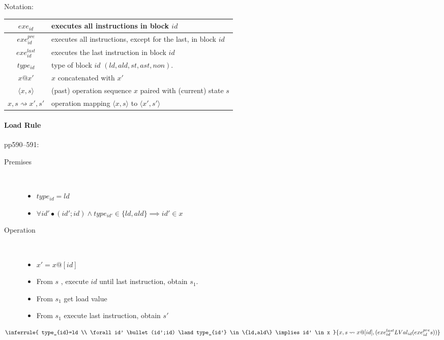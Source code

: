 Notation:\\
\begin{tabular}{|c|l|}
  \hline
  $exe_{id}$ & executes all instructions in block $id$
\\\hline
  $exe^{pre}_{id}$ & executes all instructions, except for the last, in block $id$
\\\hline
  $exe^{last}_{id}$ & executes the last instruction in block $id$
\\\hline
  $type_{id}$ & type of block $id$ $(ld,ald,st,ast,non)$.
\\\hline
  $x@x'$ & $x$ concatenated with $x'$
\\\hline
  $\langle x,s\rangle$
  & (past) operation sequence $x$ paired with (current) state $s$
\\\hline
  $x,s \rightsquigarrow x',s'$ & operation mapping $\langle x,s\rangle$ to $\langle x',s'\rangle$
\\\hline
\end{tabular}

\paragraph{Load Rule}

pp590--591:

\begin{description}
  \item [Premises]~
    \begin{itemize}
      \item $type_{id} = ld$
      \item $\forall id' \bullet
              (id';id) \land type_{id'} \in \{ld,ald\}
              \implies
              id' \in x
            $
    \end{itemize}
  \item [Operation]~
    \begin{itemize}
      \item $x' = x@[id]$
      \item From $s$ , execute $id$ until last instruction, obtain $s_1$.
      \item From $s_1$ get load value
      \item From $s_1$ execute last instruction, obtain $s'$
    \end{itemize}
\end{description}

$$
\inferrule
  { type_{id}=ld
    \\
    \forall id' \bullet
            (id';id) \land type_{id'} \in \{ld,ald\}
            \implies
            id' \in x
  }
  {x,s \rightsquigarrow x@[id],(exe_{id}^{last} LVal_{id} (exe_{id}^{pre}s))}
$$

